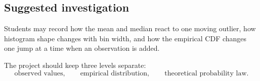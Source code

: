 \subsection*{Suggested investigation}

Students may record how the mean and median react to one moving outlier, how histogram shape changes with bin width, and how the empirical CDF changes one jump at a time when an observation is added.

\begin{summarybox}
The project should keep three levels separate:
\[
\text{observed values},\qquad
\text{empirical distribution},\qquad
\text{theoretical probability law}.
\]
\end{summarybox}
